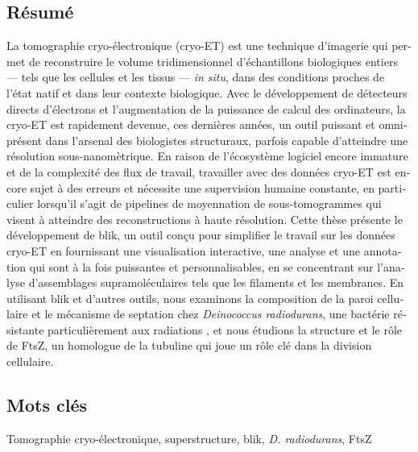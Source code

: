 \begin{otherlanguage}{french}

\section*{Résumé}
La tomographie cryo-électronique (cryo-ET) est une technique d'imagerie qui permet de reconstruire le volume tridimensionnel d'échantillons biologiques entiers --- tels que les cellules et les tissus --- \textit{in situ}, dans des conditions proches de l'état natif et dans leur contexte biologique.
Avec le développement de détecteurs directs d'électrons et l'augmentation de la puissance de calcul des ordinateurs, la cryo-ET est rapidement devenue, ces dernières années, un outil puissant et omniprésent dans l'arsenal des biologistes structuraux, parfois capable d'atteindre une résolution sous-nanomètrique.
En raison de l'écosystème logiciel encore immature et de la complexité des flux de travail, travailler avec des données cryo-ET est encore sujet à des erreurs et nécessite une supervision humaine constante, en particulier lorsqu'il s'agit de pipelines de moyennation de sous-tomogrammes qui visent à atteindre des reconstructions à haute résolution.
Cette thèse présente le développement de blik, un outil conçu pour simplifier le travail sur les données cryo-ET en fournissant une visualisation interactive, une analyse et une annotation qui sont à la fois puissantes et personnalisables, en se concentrant sur l'analyse d'assemblages supramoléculaires tels que les filaments et les membranes.
En utilisant blik et d'autres outils, nous examinons la composition de la paroi cellulaire et le mécanisme de septation chez \textit{Deinococcus radiodurans}, une bactérie résistante particulièrement aux radiations , et nous étudions la structure et le rôle de FtsZ, un homologue de la tubuline qui joue un rôle clé dans la division cellulaire.

\subsection*{Mots clés}
Tomographie cryo-électronique, superstructure, blik, \textit{D. radiodurans}, FtsZ
    
\end{otherlanguage}
